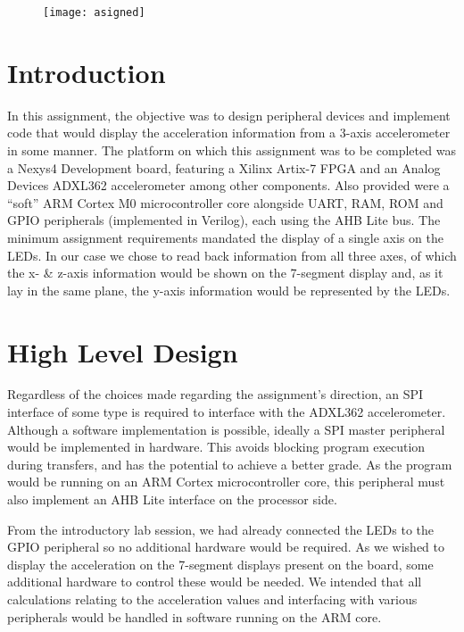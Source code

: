 \documentclass[11pt,british]{report}
\begin{document}
\begin{center}		
	\begin{figure}[!t]
		\centering
		\texttt{[image: asigned]}
	\end{figure}
\end{center}
\clearpage	
	
\section*{Introduction}
In this assignment, the objective was to design peripheral devices and implement code that would display the acceleration information from a 3-axis accelerometer in some manner. The platform on which this assignment was to be completed was a Nexys4 Development board, featuring a Xilinx Artix-7 FPGA and an Analog Devices ADXL362 accelerometer among other components. Also provided were a ``soft'' ARM Cortex M0 microcontroller core alongside UART, RAM, ROM and GPIO peripherals (implemented in Verilog), each using the AHB Lite bus. The minimum assignment requirements mandated the display of a single axis on the LEDs. In our case we chose to read back information from all three axes, of which the x- \& z-axis information would be shown on the 7-segment display and, as it lay in the same plane, the y-axis information would be represented by the LEDs. 

\section*{High Level Design}
Regardless of the choices made regarding the assignment's direction, an SPI interface of some type is required to interface with the ADXL362 accelerometer. Although a software implementation is possible, ideally a SPI master peripheral would be implemented in hardware. This avoids blocking program execution during transfers, and has the potential to achieve a better grade. As the program would be running on an ARM Cortex microcontroller core, this peripheral must also implement an AHB Lite interface on the processor side.

From the introductory lab session, we had already connected the LEDs to the GPIO peripheral so no additional hardware would be required. As we wished to display the acceleration on the 7-segment displays present on the board, some additional hardware to control these would be needed. We intended that all calculations relating to the acceleration values and interfacing with various peripherals would be handled in software running on the ARM core.
\end{document}
